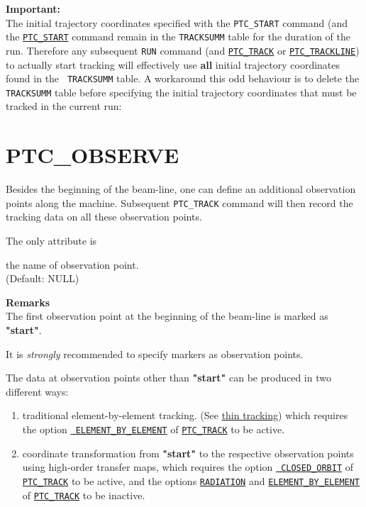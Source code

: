 {\bf Important:} \\
The initial trajectory coordinates specified with the {\tt PTC\_START} command 
(and the \hyperref[sec:ptc_start]{\tt PTC\_START} command remain in the 
{\tt TRACKSUMM} table for the duration of the \madx run. 
Therefore any subsequent {\tt RUN} command 
(and \hyperref[sec:ptc_trcak]{\tt PTC\_TRACK} or 
\hyperref[sec:ptc_trackline]{\tt PTC\_TRACKLINE}) to actually start tracking 
will effectively use {\bf all} initial trajectory coordinates found in the {\tt 
TRACKSUMM} table.
A workaround this odd behaviour is to delete the {\tt TRACKSUMM} table before 
specifying the initial trajectory coordinates that must be tracked in the 
current run:



\section{PTC\_OBSERVE} 
\label{sec:ptc_observe}

Besides the beginning of the beam-line, one can define an additional
observation points along the machine. Subsequent \texttt{PTC\_TRACK}
command will then record the tracking data on all these observation
points.  


The only attribute is 
\begin{madlist}
   the name of observation point.  \\ (Default: NULL)
\end{madlist}


{\bf Remarks}\\
The first observation point at the beginning of the beam-line is marked
as {\bf "start"}.  
       
It is {\em strongly} recommended to specify markers as observation points.

The data at observation points other than {\bf "start"} can be produced
in two different ways:
\begin{enumerate}
  \item traditional element-by-element tracking. (See
    \hyperref[chap:thintrack]{\madx thin tracking}) which 
    requires the option \hyperref[opt:element_by_element]{\tt
      ELEMENT\_BY\_ELEMENT} of \hyperref[sec:ptc_track]{\tt PTC\_TRACK} to
    be active.

  \item coordinate transformation from {\bf "start"} to the
  respective observation points using high-order \ptc transfer
  maps, which requires the option \hyperref[opt:closed_orbit]{\tt
    CLOSED\_ORBIT} of \hyperref[sec:ptc_track]{\tt PTC\_TRACK} to be
  active, and the options \hyperref[opt:radiation]{\tt RADIATION}
  and \hyperref[opt:element_by_element]{\tt ELEMENT\_BY\_ELEMENT} of
  \hyperref[sec:ptc_track]{\tt PTC\_TRACK} to be inactive.
\end{enumerate} 


